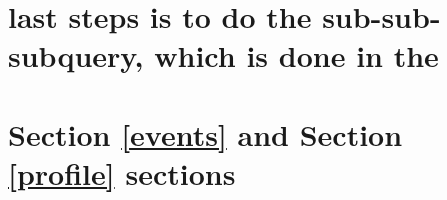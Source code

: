 \documentclass{report}
\begin{document}
\chapter{last steps is to do the sub-sub-subquery, which is done in
the}\label{last-steps-is-to-do-the-sub-sub-subquery-which-is-done-in-the}

\chapter{\texorpdfstring{Section \ref{events} and Section \ref{profile}
sections}{ and  sections}}\label{user-events-and-user-profiles-sections}


    
    
    
    
\end{document}
